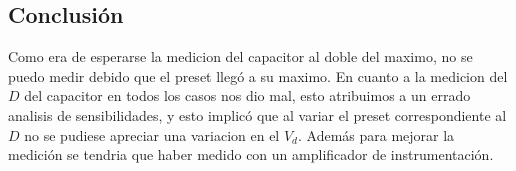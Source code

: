 \documentclass[../../main.tex]{subfiles}
\begin{document}
\subsection{Conclusión}
Como era de esperarse la medicion del capacitor al doble del maximo, no se puedo medir debido que el preset lleg\'o a su maximo. En cuanto a la medicion del $D$ del capacitor en todos los casos nos dio mal, esto atribuimos a un errado analisis de sensibilidades, y esto implic\'o que al variar el preset correspondiente al $D$ no se pudiese apreciar una variacion en el $V_d$. Adem\'as para mejorar la medición se tendria que haber medido con un amplificador de instrumentación.
\end{document}
